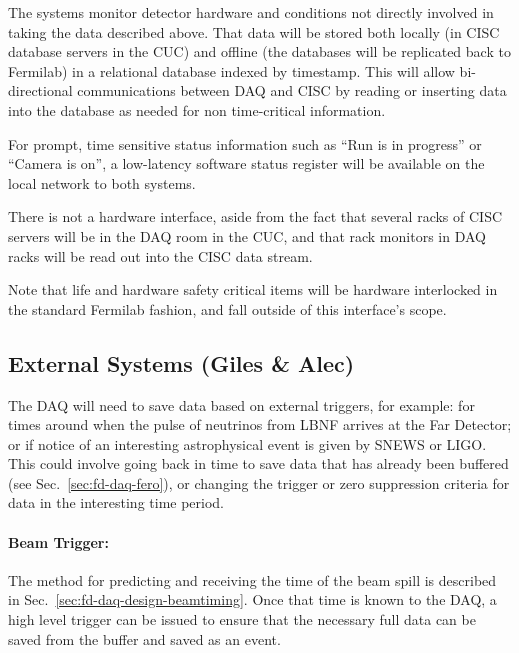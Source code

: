 The  systems monitor detector hardware and conditions not
directly involved in taking the data described above.
That data will be stored both locally (in CISC database servers in the
CUC) and offline (the databases will be replicated back to Fermilab)
in a relational database indexed by timestamp.
This will allow bi-directional communications between DAQ and CISC by
reading or inserting data into the database as needed for non
time-critical information.  

For prompt, time sensitive status information such as ``Run is in
progress'' or ``Camera is on'', a low-latency software status register
will be available on the local network to both systems.

There is not a hardware interface, aside from the fact that several
racks of CISC servers will be in the DAQ room in the CUC, and that rack
monitors in DAQ racks will be read out into the CISC data stream.

Note that life and hardware safety critical items will be hardware
interlocked in the standard Fermilab fashion, and fall outside of this
interface's scope.


\subsection{External Systems (Giles \& Alec)}
\label{sec:fd-daq-intfc-ext}


The DAQ will need to save data based on external triggers, for
example: for times around when the pulse of neutrinos from LBNF
arrives at the Far Detector; or if notice of an interesting
astrophysical event is given by SNEWS\cite{snews} or LIGO.
This could involve going back in time to save data that has already
been buffered (see Sec.~\ref{sec:fd-daq-fero}), or changing the trigger
or zero suppression criteria for data in the interesting time period.


\paragraph{Beam Trigger:} The method for predicting and receiving the
time of the beam spill is described in
Sec.~\ref{sec:fd-daq-design-beamtiming}.
Once that time is known to the DAQ, a high level trigger can be issued
to ensure that the necessary full data can be saved from the buffer
and saved as an event.

